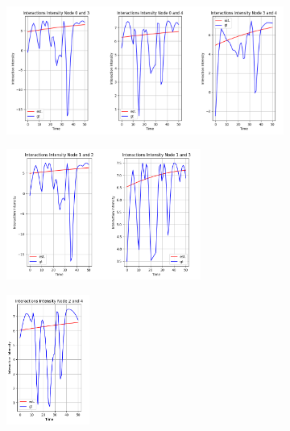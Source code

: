 \begin{figure}
    \begin{subfigure}[b]{\textwidth}
        \centering
        \includegraphics[width=\textwidth]{0_images/appendix_rq1_dyad_removal_single_step3.png}
    \end{subfigure}
    \vfill
    \begin{subfigure}[b]{\textwidth}
        \includegraphics[width=0.7\textwidth]{0_images/appendix_rq1_dyad_removal_single_step4.png}
    \end{subfigure}
    \hfill
    \begin{subfigure}[b]{\textwidth}
        \includegraphics[width=0.3\textwidth]{0_images/appendix_rq1_dyad_removal_single_step5.png}
    \end{subfigure}
\end{figure}
